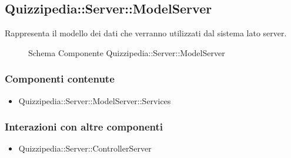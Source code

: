 \subsection{Quizzipedia::Server::ModelServer}
Rappresenta il modello dei dati che verranno utilizzati dal sistema lato server.
\begin{figure}[H]
\centering
\noindent{}
\caption[Schema Componente Quizzipedia::Server::ModelServer]{Schema Componente Quizzipedia::Server::ModelServer}
\end{figure}
\subsubsection{Componenti contenute}
\begin{itemize}
\item Quizzipedia::Server::ModelServer::Services
\end{itemize}
\subsubsection{Interazioni con altre componenti}
\begin{itemize}
\item Quizzipedia::Server::ControllerServer
\end{itemize}
